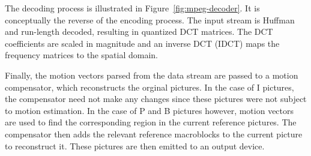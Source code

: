 The decoding process is illustrated in
Figure~\ref{fig:mpeg-decoder}. It is conceptually the reverse of the
encoding process. The input stream is Huffman and run-length decoded,
resulting in quantized DCT matrices. The DCT coefficients are scaled
in magnitude and an inverse DCT (IDCT) maps the frequency matrices to
the spatial domain.

Finally, the motion vectors parsed from the data stream are passed to
a motion compensator, which reconstructs the orginal pictures. In the
case of I pictures, the compensator need not make any changes since
these pictures were not subject to motion estimation. In the case of P
and B pictures however, motion vectors are used to find the
corresponding region in the current reference pictures. The
compensator then adds the relevant reference macroblocks to the
current picture to reconstruct it. These pictures are then emitted to
an output device.
